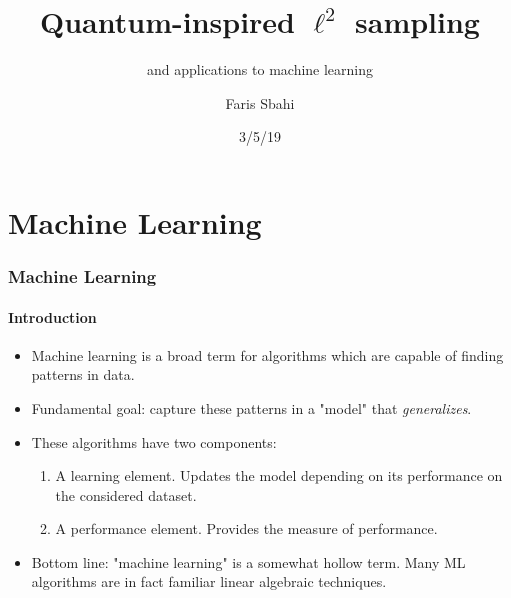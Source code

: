 \documentclass{beamer}
\title{Quantum-inspired $\ell^2$ sampling}
\subtitle{and applications to machine learning}
\author[Sbahi] %
{Faris Sbahi}
\date{3/5/19}
\newcommand\0{\mathbf{0}}
\newcommand\<{\langle}
\renewcommand\>{\rangle}
\begin{document}
\maketitle


\section{Machine Learning}

\begin{frame}
    \frametitle{Machine Learning}
    \framesubtitle{Introduction}
    \begin{itemize}
    \item Machine learning is a broad term for algorithms which are capable of finding patterns in data.
    \item Fundamental goal: capture these patterns in a "model" that \textit{generalizes}.
    \item These algorithms have two components:
    \begin{enumerate}
    \item A learning element. Updates the model depending on its performance on the considered dataset.
    \item A performance element. Provides the measure of performance.
    \end{enumerate}
	\item Bottom line: "machine learning" is a somewhat hollow term. Many ML algorithms are in fact familiar linear algebraic techniques.
    \end{itemize}
    \end{frame}
\end{document}
